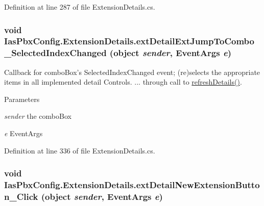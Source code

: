 Definition at line 287 of file ExtensionDetails.cs.\hypertarget{class_ias_pbx_config_1_1_extension_details_a5acaa568c7925fcb22e39c766849b66e}{
\subsubsection[{extDetailExtJumpToCombo\_\-SelectedIndexChanged}]{\setlength{\rightskip}{0pt plus 5cm}void IasPbxConfig.ExtensionDetails.extDetailExtJumpToCombo\_\-SelectedIndexChanged (object {\em sender}, \/  EventArgs {\em e})}}
\label{class_ias_pbx_config_1_1_extension_details_a5acaa568c7925fcb22e39c766849b66e}


Callback for comboBox's SelectedIndexChanged event; (re)selects the appropriate items in all implemented detail Controls. ... through call to \hyperlink{class_ias_pbx_config_1_1_extension_details_a43785b4be5bf7a2b2cb5cfe80e7aba06}{refreshDetails()}. 
\begin{DoxyParams}{Parameters}
\item[{\em sender}]the comboBox \item[{\em e}]EventArgs \end{DoxyParams}


Definition at line 336 of file ExtensionDetails.cs.\hypertarget{class_ias_pbx_config_1_1_extension_details_afe0fc5f796c8ffc1e2efc74b0843ffa4}{
\subsubsection[{extDetailNewExtensionButton\_\-Click}]{\setlength{\rightskip}{0pt plus 5cm}void IasPbxConfig.ExtensionDetails.extDetailNewExtensionButton\_\-Click (object {\em sender}, \/  EventArgs {\em e})}}
\label{class_ias_pbx_config_1_1_extension_details_afe0fc5f796c8ffc1e2efc74b0843ffa4}


